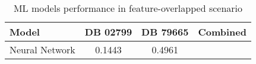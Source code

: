 \begin{table}[ht]
  \centering
  \caption{ML models performance in feature-overlapped scenario}
  \label{tab:hfl_ml_models_comparison}
  \begin{tabular}{lccc}
  \toprule
  \textbf{Model} & \textbf{DB 02799} & \textbf{DB 79665} & \textbf{Combined} \\
  \midrule
  Neural Network & 0.1443 & 0.4961 &  \\
  \bottomrule
  \end{tabular}
  \end{table}